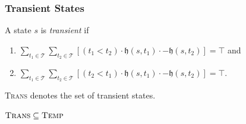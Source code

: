 \subsubsection{Transient States}

\begin{defn}
  A state $s$ is \textit{transient} if
  \begin{enumerate}
    \item $\displaystyle \sum_{t_1 \in \mathcal{T}} \sum_{t_2 \in \mathcal{T}} [(t_1 < t_2) \cdot \mathfrak{h}(s, t_1) \cdot - \mathfrak{h}(s, t_2)] = \top$ and
    \item $\displaystyle \sum_{t_1 \in \mathcal{T}} \sum_{t_2 \in \mathcal{T}} [(t_2 < t_1) \cdot \mathfrak{h}(s, t_1) \cdot - \mathfrak{h}(s, t_2)] = \top$.
  \end{enumerate}
\end{defn}

\textsc{Trans} denotes the set of transient states.


$\textsc{Trans} \subseteq \textsc{Temp}$



